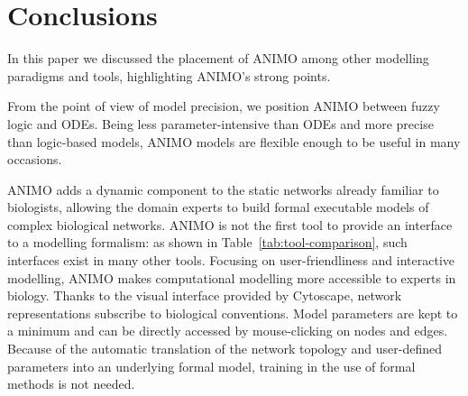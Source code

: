 \documentclass{bmcart}
\begin{document}
\section*{Conclusions}
%
%

In this paper we discussed the placement of ANIMO among other modelling paradigms and tools,
highlighting ANIMO's strong points.

From the point of view of model precision, we position ANIMO between fuzzy logic and ODEs.
Being less parameter-intensive than ODEs and more precise than logic-based models,
ANIMO models are flexible enough to be useful in many occasions.

ANIMO adds a dynamic component to the static networks already familiar to biologists,
allowing the domain experts to build formal executable models of complex biological networks.
ANIMO is not the first tool to provide an interface to a
modelling formalism: as shown in Table~\ref{tab:tool-comparison}, such interfaces exist in many other tools.
Focusing on user-friendliness and interactive modelling, ANIMO
makes computational modelling more accessible to experts in biology.
Thanks to the visual
interface provided by Cytoscape, network representations subscribe to biological conventions.
Model parameters are kept to a minimum and can be directly accessed by mouse-clicking on
nodes and edges. Because of the automatic translation of the network topology and
user-defined parameters into an underlying formal model, training in the use of formal methods
is not needed.
\end{document}
